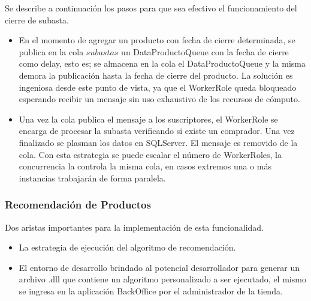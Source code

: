 \documentclass[journal]{IEEEtran}
\begin{document}
Se describe a continuación los pasos para que sea efectivo el funcionamiento del cierre de subasta.
\begin{itemize}
  \item En el momento de agregar un producto con fecha de cierre determinada, se publica en la cola $subastas$ un DataProductoQueue con la fecha de cierre como delay, esto es; se almacena en la cola el DataProductoQueue y la misma demora la publicación hasta la fecha de cierre del producto. La solución es ingeniosa desde este punto de vista, ya que el WorkerRole queda bloqueado esperando recibir un mensaje sin uso exhaustivo de los recursos de cómputo.
  \item Una vez la cola publica el mensaje a los suscriptores, el WorkerRole se encarga de procesar la subasta verificando si existe un comprador. Una vez finalizado se plasman los datos en SQLServer. El mensaje es removido de la cola. Con esta estrategia se puede escalar el número de WorkerRoles, la concurrencia la controla la misma cola, en casos extremos una o más instancias trabajarán de forma paralela.
\end{itemize}

\subsubsection{Recomendación de Productos} \label{sec:recomendacionproductos}
Dos aristas importantes para la implementación de esta funcionalidad.
\begin{itemize}
   \item La estrategia de ejecución del algoritmo de recomendación.
   \item El entorno de desarrollo brindado al potencial desarrollador para generar un archivo .dll que contiene un algoritmo personalizado a ser ejecutado, el mismo se ingresa en la aplicación BackOffice por el administrador de la tienda.
 \end{itemize} 
\end{document}
